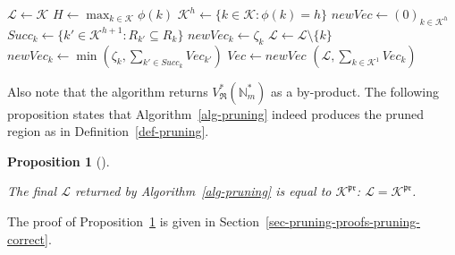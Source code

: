 \documentclass[
  11pt,
  a4paper,
]{article}
\theoremstyle{plain}
\theoremstyle{definition}
\theoremstyle{plain}
\theoremstyle{definition}
\theoremstyle{plain}
\newtheorem{proposition}{Proposition}[section]
\theoremstyle{remark}
\begin{document}
\begin{algorithm}[htb!]
\caption{Pruning of a complete $\mathfrak{R}$}
\label{alg-pruning}
\begin{algorithmic}[1]
  \State $\mathcal{L}\gets\mathcal{K}$
  \State $ H \gets \max_{k\in\mathcal{K}} \phi(k)  $ 
    \State $\mathcal{K}^h\gets \{ k\in\mathcal{K} : \phi(k) =h  \}$
    \State $newVec\gets (0)_{k \in  \mathcal{K}^h}$
      \State $Succ_k \gets \{ k' \in  \mathcal{K}^{h+1} : R_{k'}\subseteq R_k\}$
        \State $newVec_k \gets \zeta_k$
      \Else
          \State $\mathcal{L}\gets \mathcal{L}\setminus \{ k \}$ 
        \EndIf
        \State $newVec_k \gets \min\left( \zeta_{k} ,  \sum_{k'\in Succ_k} Vec_{k'}   \right)$
      \EndIf
    \EndFor
    \State $Vec\gets newVec$
  \EndFor
  \State\Return $(\mathcal{L},\sum_{k\in\mathcal{K}^1} Vec_k  )$
\EndProcedure
\end{algorithmic}
\end{algorithm}

Also note that the algorithm returns
\(V^*_{\mathfrak{R}}(\mathbb{N}_m^*)\) as a by-product. The following
proposition states that  Algorithm~\ref{alg-pruning}  indeed produces
the pruned region as in Definition~\ref{def-pruning}.

\begin{proposition}[]\protect\hypertarget{prp-pruning-correct}{}\label{prp-pruning-correct}

The final \(\mathcal{L}\) returned by  Algorithm~\ref{alg-pruning}  is
equal to \(\mathcal{K}^{\mathfrak{pr}}\):
\(\mathcal{L}=\mathcal{K}^{\mathfrak{pr}}\).

\end{proposition}

The proof of Proposition~\ref{prp-pruning-correct} is given in
Section~\ref{sec-pruning-proofs-pruning-correct}.
\end{document}
